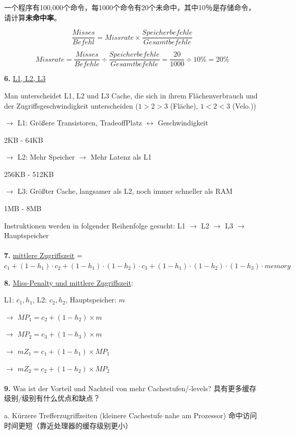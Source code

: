 \documentclass[fleqn]{article}
\begin{document}
一个程序有100,000个命令，每1000个命令有20个未命中，其中10％是存储命令，请计算\textbf {未命中率}。

$$\frac{Misses}{Befehl}=Missrate\times \frac{Speicherbefehle}{Gesamtbefehle}$$

$$Missrate = \frac{Misses}{Befehle}\div \frac{Speicherbefehle}{Gesamtbefehle}=\frac{20}{1000}\div 10\%=20\%$$

\noindent\textbf{6.}
\underline{L1, L2, L3}

Man unterscheidet L1, L2 und L3 Cache, die sich in ihrem Flächenverbrauch und der Zugriffsgeschwindigkeit unterscheiden ($1>2>3$ (Fläche), $1<2<3$ (Velo.))

$\rightarrow$ L1: Größere Transistoren, TradeoffPlatz $\leftrightarrow$ Geschwindigkeit

\indent\indent\indent 2KB - 64KB

$\rightarrow$ L2: Mehr Speicher $\rightarrow$ Mehr Latenz als L1

\indent\indent\indent 256KB - 512KB

$\rightarrow$ L3: Größter Cache, langsamer als L2, noch immer schneller als RAM

\indent\indent\indent 1MB - 8MB

\noindent Instruktionen werden in folgender Reihenfolge gesucht: L1 $\rightarrow$ L2 $\rightarrow$ L3 $\rightarrow$ Hauptspeicher
\\
\\
\noindent\textbf{7.} \underline{mittlere Zugriffszeit} = $c_1+(1-h_1)\cdot c_2 +(1-h_1)\cdot(1-h_2)\cdot c_3 + (1-h_1)\cdot(1-h_2)\cdot(1-h_3)\cdot memory$

\noindent\textbf{8.} \underline{Miss-Penalty und mittlere Zugriffszeit}:

L1: $c_1,h_1$, L2: $c_2,h_2$, Hauptspeicher: $m$

$\rightarrow$ $MP_1 = c_2+(1-h_2)\times m$

$\rightarrow$ $MP_2 = c_3+(1-h_3)\times m$

$\rightarrow$ $mZ_1 = c_1 + (1-h_1)\times MP_1$

$\rightarrow$ $mZ_2 = c_2 + (1-h_2)\times MP_2$
\\
\\
\noindent\textbf{9.} Was ist der Vorteil und Nachteil von mehr Cachestufen/-levels? 具有更多缓存级别/级别有什么优点和缺点？

a. Kürzere Trefferzugriffzeiten (kleinere Cachestufe nahe am Prozessor) 命中访问时间更短（靠近处理器的缓存级别更小）
\end{document}
